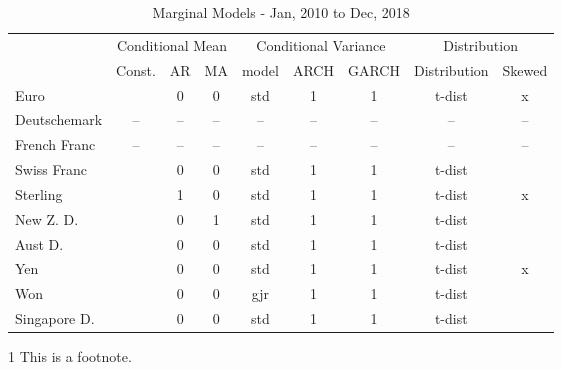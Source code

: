 \documentclass[12pt]{article}
\begin{document}
\begin{table}
	\caption{Marginal Models - Jan, 2010 to Dec, 2018}
	\begin{threeparttable}
		\begin{tabular}[l]{l c c c c c c c c}
	    \hline
	& \multicolumn{3}{c}{Conditional Mean}  & \multicolumn{3}{c}{Conditional Variance}  & \multicolumn{2}{c}{Distribution} \\
			            & Const.     & AR & MA & model & ARCH & GARCH & Distribution & Skewed     \\
	\hline
	    Euro            & \checkmark & 0  & 0  & std   & 1    & 1     & t-dist       & x          \\
		Deutschemark    & --         & -- & -- & --    & --   & --    & --           & --         \\
		French Franc    & --         & -- & -- & --    & --   & --    & --           & --         \\
		Swiss Franc     & \checkmark & 0  & 0  & std   & 1    & 1     & t-dist       & \checkmark \\
		Sterling        & \checkmark & 1  & 0  & std   & 1    & 1     & t-dist       & x          \\
		New Z. D.       & \checkmark & 0  & 1  & std   & 1    & 1     & t-dist       & \checkmark \\
		Aust D.         & \checkmark & 0  & 0  & std   & 1    & 1     & t-dist       & \checkmark \\
		Yen             & \checkmark & 0  & 0  & std   & 1    & 1     & t-dist       & x          \\
		Won             & \checkmark & 0  & 0  & gjr   & 1    & 1     & t-dist       & \checkmark \\
		Singapore D.    & \checkmark & 0  & 0  & std   & 1    & 1     & t-dist       & \checkmark \\
	\hline
		\end{tabular}
		\begin{tablenotes}
			\item[1]{\footnotesize This is a footnote.}
		\end{tablenotes}
	\end{threeparttable}
\end{table}
\end{document}
